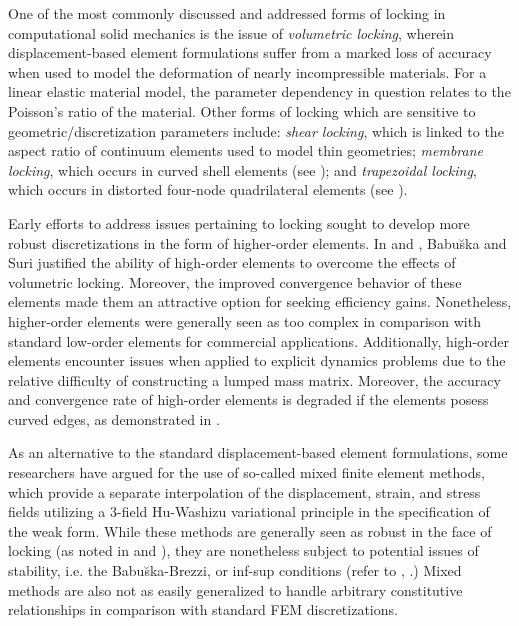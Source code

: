 		One of the most commonly discussed and addressed forms of locking in computational solid mechanics is the issue of \textit{volumetric locking}, wherein displacement-based element formulations suffer from a marked loss of accuracy when used to model the deformation of nearly incompressible materials. For a linear elastic material model, the parameter dependency in question relates to the Poisson's ratio of the material. Other forms of locking which are sensitive to geometric/discretization parameters include: \textit{shear locking}, which is linked to the aspect ratio of continuum elements used to model thin geometries; \textit{membrane locking}, which occurs in curved shell elements (see \cite{Winkler:10}); and \textit{trapezoidal locking}, which occurs in distorted four-node quadrilateral elements (see \cite{MacNeal:87}).
	
		
		Early efforts to address issues pertaining to locking sought to develop more robust discretizations in the form of higher-order elements. In \cite{Babuska&Suri:92:2} and \cite{Suri:91}, Babu\u{s}ka and Suri justified the ability of high-order elements to overcome the effects of volumetric locking. Moreover, the improved convergence behavior of these elements made them an attractive option for seeking efficiency gains. Nonetheless, higher-order elements were generally seen as too complex in comparison with standard low-order elements for commercial applications. Additionally, high-order elements encounter issues when applied to explicit dynamics problems due to the relative difficulty of constructing a lumped mass matrix. Moreover, the accuracy and convergence rate of high-order elements is degraded if the elements posess curved edges, as demonstrated in \cite{Lee&Bathe:93}.
			
		As an alternative to the standard displacement-based element formulations, some researchers have argued for the use of so-called mixed finite element methods, which provide a separate interpolation of the displacement, strain, and stress fields utilizing a 3-field Hu-Washizu variational principle in the specification of the weak form. While these methods are generally seen as robust in the face of locking (as noted in \cite{Babuska&Suri:92:1} and \cite{Babuska&Suri:92:2}), they are nonetheless subject to potential issues of stability, i.e. the Babu\u{s}ka-Brezzi, or inf-sup conditions (refer to \cite{Babuska:71}, \cite{Brezzi:74}.) Mixed methods are also not as easily generalized to handle arbitrary constitutive relationships in comparison with standard FEM discretizations.
		
